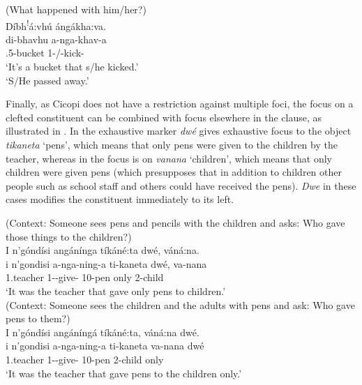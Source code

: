 \documentclass[output=paper]{langscibook}
\begin{document}
\z

\ea
\label{bkm:Ref141364685}
(What happened with him/her?)\\
Díbh\textsuperscript{!}á:vhú ángákha:va.\\
\gll
di-bhavhu  a-nga-khav-a\\
\COP{}.5-bucket  1\SM{}-\REL{}/\PFV{}-kick-\FV{}\\
\glt
‘It’s a bucket that s/he kicked.’\\
‘S/He passed away.’


\z

Finally, as Cicopi does not have a restriction against multiple foci, the focus on a clefted constituent can be combined with focus elsewhere in the clause, as illustrated in . In  the exhaustive marker \textit{dwé} gives exhaustive focus to the object \textit{tikaneta} ‘pens’, which means that only pens were given to the children by the teacher, whereas in  the focus is on \textit{vanana} ‘children’, which means that only children were given pens (which presupposes that in addition to children other people such as school staff and others could have received the pens). \textit{Dwe} in these cases modifies the constituent immediately to its left.

\ea\label{bkm:Ref120693735}
\ea
\label{bkm:Ref120693735:a}
(Context: Someone sees pens and pencils with the children and asks: Who gave those things to the children?)\\
I n’góndísi angánínga tíkáné:ta dwé, váná:na.\\
\gll
i  n’gondisi  a-nga-ning-a  ti-kaneta  dwé,  va-nana\\
\COP{}  1.teacher  1\SM{}-\REL{}-give-\FV{}  10-pen  only  2-child\\
\glt
‘It was the teacher that gave only pens to children.’\\


\ex
\label{bkm:Ref120693735:b}
(Context: Someone sees the children and the adults with pens and ask: Who gave pens to them?)\\
I n’góndísi angáníngá tíkáné:ta, váná:na dwé.\\
\gll
i  n’gondisi  a-nga-ning-a  ti-kaneta  va-nana  dwé\\
\COP{}  1.teacher  1\SM{}-\REL{}-give-\FV{}  10-pen  2-child  only\\
\glt
‘It was the teacher that gave pens to the children only.’\\
\end{document}
